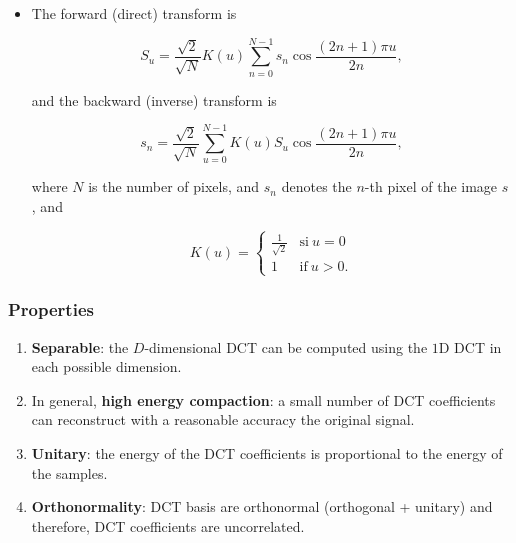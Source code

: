 \begin{itemize}
\item
  The forward (direct) transform is

  \begin{equation}
    S_u = \frac{\sqrt{2}}{\sqrt{N}}
    K(u)\sum_{n=0}^{N-1} s_n\cos\frac{(2n+1)\pi u}{2n},
  \end{equation}

  and the backward (inverse) transform is

  \begin{equation}
    s_n = \frac{\sqrt{2}}{\sqrt{N}}
    \sum_{u=0}^{N-1} K(u)S_u\cos\frac{(2n+1)\pi u}{2n},
  \end{equation}

  where \(N\) is the number of pixels, and \(s_n\) denotes the \(n\)-th
  pixel of the image \(s\), and

  \begin{equation}
    K(u) =
    \left\{
      \begin{array}{ll}
      \frac{1}{\sqrt{2}} & \text{si}~u=0\\
        1 & \text{if}~u>0.
      \end{array}
      \right.
  \end{equation}
\end{itemize}

\hypertarget{properties}{%
\subsubsection{Properties}\label{properties}}

\begin{enumerate}
\def\labelenumi{\arabic{enumi}.}
\tightlist
\item
  \textbf{Separable}: the \(D\)-dimensional DCT can be computed using
  the \(1\)D DCT in each possible dimension.
\item
  In general, \textbf{high energy compaction}: a small number of DCT
  coefficients can reconstruct with a reasonable accuracy the original
  signal.
\item
  \textbf{Unitary}: the energy of the DCT coefficients is proportional
  to the energy of the samples.
\item
  \textbf{Orthonormality}: DCT basis are orthonormal (orthogonal +
  unitary) and therefore, DCT coefficients are uncorrelated.
\end{enumerate}

